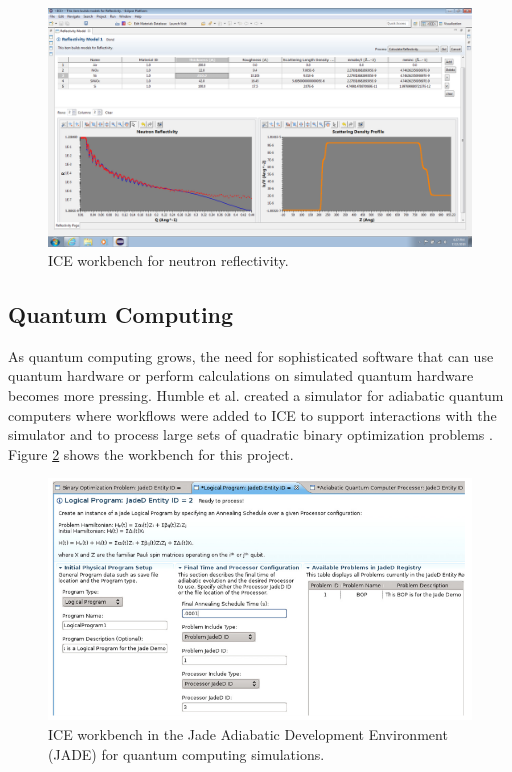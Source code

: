 \begin{figure}[H]
\centering
\includegraphics[width=\textwidth]{images/reflectivity-screenshot.png}
\caption{ICE workbench for neutron reflectivity.}
\label{reflectivity}
\end{figure}

\subsection{Quantum Computing}\label{quantum-computing}

As quantum computing grows, the need for sophisticated
software that can use quantum hardware or perform calculations on
simulated quantum hardware becomes more pressing. Humble et al. created a simulator for
adiabatic quantum computers where workflows were added to ICE to support
interactions with the simulator and to process large sets of
quadratic binary optimization problems \cite{humble_integrated_2014}. Figure \ref{jade} shows the workbench for this project.

\begin{figure}[H]
\centering
\includegraphics[width=\textwidth]{images/jaded.png}
\caption{ICE workbench in the Jade Adiabatic Development Environment (JADE) for quantum computing simulations.}
\label{jade}
\end{figure}

